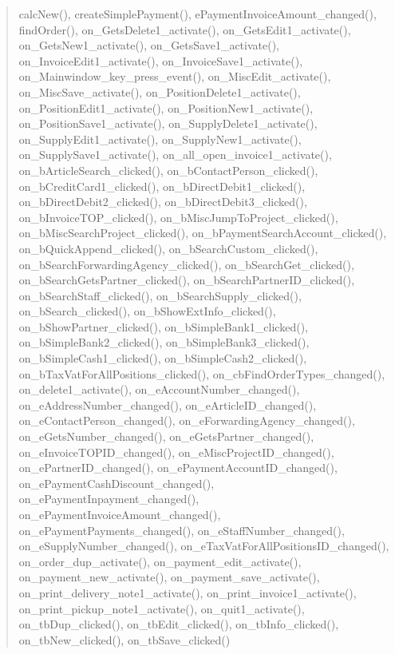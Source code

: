 \begin{quote}
calcNew(), createSimplePayment(), ePaymentInvoiceAmount\_changed(), findOrder(), on\_GetsDelete1\_activate(), on\_GetsEdit1\_activate(), on\_GetsNew1\_activate(), on\_GetsSave1\_activate(), on\_InvoiceEdit1\_activate(), on\_InvoiceSave1\_activate(), on\_Mainwindow\_key\_press\_event(), on\_MiscEdit\_activate(), on\_MiscSave\_activate(), on\_PositionDelete1\_activate(), on\_PositionEdit1\_activate(), on\_PositionNew1\_activate(), on\_PositionSave1\_activate(), on\_SupplyDelete1\_activate(), on\_SupplyEdit1\_activate(), on\_SupplyNew1\_activate(), on\_SupplySave1\_activate(), on\_all\_open\_invoice1\_activate(), on\_bArticleSearch\_clicked(), on\_bContactPerson\_clicked(), on\_bCreditCard1\_clicked(), on\_bDirectDebit1\_clicked(), on\_bDirectDebit2\_clicked(), on\_bDirectDebit3\_clicked(), on\_bInvoiceTOP\_clicked(), on\_bMiscJumpToProject\_clicked(), on\_bMiscSearchProject\_clicked(), on\_bPaymentSearchAccount\_clicked(), on\_bQuickAppend\_clicked(), on\_bSearchCustom\_clicked(), on\_bSearchForwardingAgency\_clicked(), on\_bSearchGet\_clicked(), on\_bSearchGetsPartner\_clicked(), on\_bSearchPartnerID\_clicked(), on\_bSearchStaff\_clicked(), on\_bSearchSupply\_clicked(), on\_bSearch\_clicked(), on\_bShowExtInfo\_clicked(), on\_bShowPartner\_clicked(), on\_bSimpleBank1\_clicked(), on\_bSimpleBank2\_clicked(), on\_bSimpleBank3\_clicked(), on\_bSimpleCash1\_clicked(), on\_bSimpleCash2\_clicked(), on\_bTaxVatForAllPositions\_clicked(), on\_cbFindOrderTypes\_changed(), on\_delete1\_activate(), on\_eAccountNumber\_changed(), on\_eAddressNumber\_changed(), on\_eArticleID\_changed(), on\_eContactPerson\_changed(), on\_eForwardingAgency\_changed(), on\_eGetsNumber\_changed(), on\_eGetsPartner\_changed(), on\_eInvoiceTOPID\_changed(), on\_eMiscProjectID\_changed(), on\_ePartnerID\_changed(), on\_ePaymentAccountID\_changed(), on\_ePaymentCashDiscount\_changed(), on\_ePaymentInpayment\_changed(), on\_ePaymentInvoiceAmount\_changed(), on\_ePaymentPayments\_changed(), on\_eStaffNumber\_changed(), on\_eSupplyNumber\_changed(), on\_eTaxVatForAllPositionsID\_changed(), on\_order\_dup\_activate(), on\_payment\_edit\_activate(), on\_payment\_new\_activate(), on\_payment\_save\_activate(), on\_print\_delivery\_note1\_activate(), on\_print\_invoice1\_activate(), on\_print\_pickup\_note1\_activate(), on\_quit1\_activate(), on\_tbDup\_clicked(), on\_tbEdit\_clicked(), on\_tbInfo\_clicked(), on\_tbNew\_clicked(), on\_tbSave\_clicked()
\end{quote}

